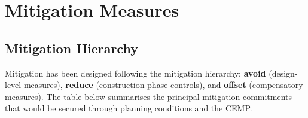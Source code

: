\section{Mitigation Measures}

\subsection{Mitigation Hierarchy}
Mitigation has been designed following the mitigation hierarchy: \textbf{avoid} (design-level measures), \textbf{reduce} (construction-phase controls), and \textbf{offset} (compensatory measures). The table below summarises the principal mitigation commitments that would be secured through planning conditions and the CEMP.

\vspace{6pt}
\renewcommand{\arraystretch}{1.35}
\footnotesize
